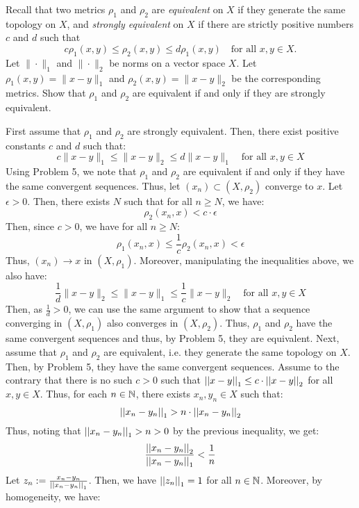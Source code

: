 \documentclass[12pt]{article}
\begin{document}


\begin{problem}{1}
    Recall that two metrics $\rho_1$ and $\rho_2$ are \emph{equivalent} on $X$ if they generate the same topology on $X$, and \emph{strongly equivalent} on $X$ if there are strictly positive numbers $c$ and $d$ such that
    \[
    c \rho_1(x, y) \leq \rho_2(x, y) \leq d \rho_1(x, y)
    \quad \text{for all } x, y \in X.
    \]
    Let $\| \cdot \|_1$ and $\| \cdot \|_2$ be norms on a vector space $X$. Let $\rho_1(x, y) = \|x - y\|_1$ and $\rho_2(x, y) = \|x - y\|_2$ be the corresponding metrics. Show that $\rho_1$ and $\rho_2$ are equivalent if and only if they are strongly equivalent.
\end{problem}
\begin{solution}
    First assume that $\rho_1$ and $\rho_2$ are strongly equivalent. Then, there exist positive constants $c$ and $d$ such that:
    \[c \|x - y\|_1 \leq \|x - y\|_2 \leq d \|x - y\|_1\quad \text{for all } x, y \in X \]
    Using Problem 5, we note that $\rho_1$ and $\rho_2$ are equivalent if and only if they have the same convergent sequences. Thus, let $(x_n) \subset (X, \rho_2)$ converge to $x$. Let $\epsilon > 0$. Then, there exists $N$ such that for all $n \geq N$, we have: 
    \[ \rho_2(x_n, x) < c \cdot \epsilon\]
    Then, since $c > 0$, we have for all $n \geq N$:
    \[ \rho_1(x_n, x) \leq \frac{1}{c}\rho_2(x_n, x) < \epsilon\]
    Thus, $(x_n) \to x$ in $(X, \rho_1)$. Moreover, manipulating the inequalities above, we also have: 
    \[\frac{1}{d} \|x - y\|_2 \leq \|x - y\|_1 \leq \frac{1}{c} \|x - y\|_2 \quad \text{for all } x, y \in X \]
    Then, as $\frac{1}{d} > 0$, we can use the same argument to show that a sequence converging in $(X, \rho_1)$ also converges in $(X, \rho_2)$. Thus, $\rho_1$ and $\rho_2$ have the same convergent sequences and thus, by Problem 5, they are equivalent. \bbni
    Next, assume that $\rho_1$ and $\rho_2$ are equivalent, i.e. they generate the same topology on $X$. Then, by Problem 5, they have the same convergent sequences. Assume to the contrary that there is no such $c > 0$ such that $\left\vert\left\vert x-y\right\vert\right\vert_1 \leq c\cdot \left\vert\left\vert x-y\right\vert\right\vert_2$ for all $x, y \in X$. Thus, for each $n \in \mathbb N$, there exists $x_n, y_n \in X$ such that:
    \[ \left\vert\left\vert x_n-y_n\right\vert\right\vert_1 > n \cdot \left\vert\left\vert x_n-y_n\right\vert\right\vert_2\]
    Thus, noting that $\left\vert\left\vert x_n-y_n\right\vert\right\vert_1 > n > 0$ by the previous inequality, we get:
    \[\frac{\left\vert\left\vert x_n-y_n\right\vert\right\vert_2}{\left\vert\left\vert x_n-y_n\right\vert\right\vert_1} < \frac{1}{n}\]
    Let $z_n := \frac{x_n - y_n}{\left\vert\left\vert x_n-y_n\right\vert\right\vert_1}$. Then, we have $\left\vert\left\vert z_n\right\vert\right\vert_1 = 1$ for all $n \in \mathbb N$. Moreover, by homogeneity, we have: 

\end{solution}
\end{document}
